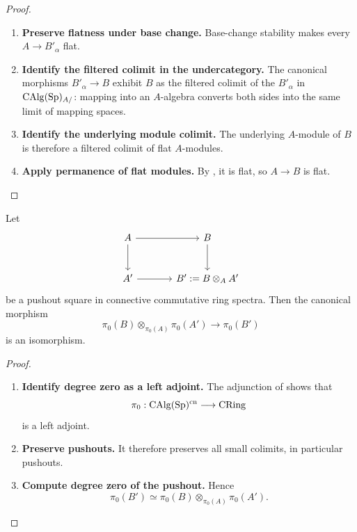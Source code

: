 \begin{proof}
\begin{enumerate}[label=\textup{(\arabic*)}]
    \item \textbf{Preserve flatness under base change.}
    Base-change stability makes every \(A\to B'_\alpha\) flat.

    \item \textbf{Identify the filtered colimit in the undercategory.}
    The canonical
    morphisms \(B'_\alpha\to B\) exhibit \(B\) as the filtered colimit of the
    \(B'_\alpha\) in \(\operatorname{CAlg}(\operatorname{Sp})_{A/}\): mapping into an \(A\)-algebra
    converts both sides into the same limit of mapping spaces.

    \item \textbf{Identify the underlying module colimit.}
    The underlying \(A\)-module of \(B\) is therefore a filtered colimit of
    flat \(A\)-modules.

    \item \textbf{Apply permanence of flat modules.}
    By , it is flat, so
    \(A\to B\) is flat.
\end{enumerate}
\end{proof}

\begin{proposition}
\label{prop:classical-truncation-affine-base-change}
Let
\[
\begin{tikzcd}[column sep=large, row sep=large]
    A
        \arrow[r]
        \arrow[d]
    &
    B
        \arrow[d]
    \\
    A'
        \arrow[r]
    &
    B':=B\otimes_AA'
\end{tikzcd}
\]
be a pushout square in connective commutative ring spectra. Then the
canonical morphism
\[
    \pi_0(B)
    \otimes_{\pi_0(A)}
    \pi_0(A')
    \longrightarrow
    \pi_0(B')
\]
is an isomorphism.
\end{proposition}

\begin{proof}
\leavevmode
\begin{enumerate}[label=\textup{(\arabic*)}]
    \item \textbf{Identify degree zero as a left adjoint.}
    The adjunction of  shows that
    \[
        \pi_0
        :
        \operatorname{CAlg}(\operatorname{Sp})^{\mathrm{cn}}
        \longrightarrow
        \operatorname{CRing}
    \]
    is a left adjoint.

    \item \textbf{Preserve pushouts.}
    It therefore preserves all small colimits, in
    particular pushouts.

    \item \textbf{Compute degree zero of the pushout.}
    Hence
    \[
        \pi_0(B')
        \simeq
        \pi_0(B)
        \otimes_{\pi_0(A)}
        \pi_0(A').
    \]
\end{enumerate}
\end{proof}

